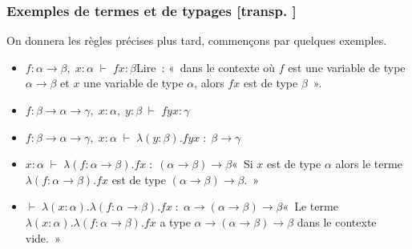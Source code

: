 \documentclass[mathserif,a4paper,aspectratio=169]{beamer}
\renewcommand{\frametitle}[1]{\subsubsection*{#1 {\footnotesize[transp. \insertframenumber]}}}
\begin{document}
\begin{frame}
\frametitle{Exemples de termes et de typages}

{\footnotesize On donnera les règles précises plus tard, commençons
  par quelques exemples.\par}

\begin{itemize}
\item $f:\alpha\to\beta,\; x:\alpha \;\vdash\; fx:\beta$\newline Lire : « dans le
  contexte où $f$ est une variable de type $\alpha\to\beta$ et $x$ une
  variable de type $\alpha$, alors $fx$ est de type $\beta$ ».
\item $f:\beta\to\alpha\to\gamma,\; x:\alpha,\; y:\beta \;\vdash\; fyx
  : \gamma$
\item $f:\beta\to\alpha\to\gamma,\; x:\alpha \;\vdash\;
  \lambda(y:\beta).fyx \;:\; \beta\to\gamma$
\item $x:\alpha \;\vdash\;
  \lambda(f:\alpha\to\beta).fx\;:\;(\alpha\to\beta)\to\beta$\newline « Si
  $x$ est de type $\alpha$ alors le terme
  $\lambda(f:\alpha\to\beta).fx$ est de type
  $(\alpha\to\beta)\to\beta$. »
\item $\vdash\; \lambda(x:\alpha).
  \lambda(f:\alpha\to\beta).fx\;:\;\alpha\to(\alpha\to\beta)\to\beta$\newline « Le
  terme $\lambda(x:\alpha).\lambda(f:\alpha\to\beta).fx$ a type
  $\alpha\to(\alpha\to\beta)\to\beta$ dans le contexte
  vide. »
\end{itemize}

\end{frame}
%
\end{document}
